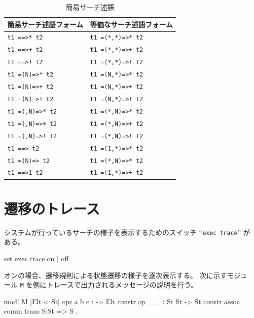 \documentclass{article}
\begin{document}
\begin{table}[htbp]
  \caption{簡易サーチ述語}
  \label{tab:easy-go}
  \begin{center}
    \begin{tabular} {|l|l|}\hline
      簡易サーチ述語フォーム & 等価なサーチ述語フォーム \\\hline\hline
      \texttt{t1 ==>* t2} & \texttt{t1 =(*,*)=>* t2} \\
      \texttt{t1 ==>+ t2} & \texttt{t1 =(*,*)=>+ t2} \\
      \texttt{t1 ==>! t2} & \texttt{t1 =(*,*)=>! t2} \\\hline
      \texttt{t1 =(N)=>* t2} & \texttt{t1 =(N,*)=>* t2} \\
      \texttt{t1 =(N)=>+ t2} & \texttt{t1 =(N,*)=>+ t2} \\
      \texttt{t1 =(N)=>! t2} & \texttt{t1 =(N,*)=>! t2} \\\hline
      \texttt{t1 =(,N)=>* t2} & \texttt{t1 =(*,N)=>* t2} \\
      \texttt{t1 =(,N)=>+ t2} & \texttt{t1 =(*,N)=>+ t2} \\
      \texttt{t1 =(,N)=>! t2} & \texttt{t1 =(*,N)=>! t2} \\\hline
      \texttt{t1 ==> t2} & \texttt{t1 =(1,*)=>* t2} \\
      \texttt{t1 =(N)=> t2} & \texttt{t1 =(*,N)=>* t2}\\
      \texttt{t1 ==>1 t2} & \texttt{t1 =(1,*)=>+ t2} \\\hline
    \end{tabular}
  \end{center}
\end{table}

\section{遷移のトレース}
\label{sec:trans-trace}
システムが行っているサーチの様子を表示するためのスイッチ
``\texttt{exec trace}'' がある。

\begin{simplev}
	set exec trace {on | off}
\end{simplev}

オンの場合、遷移規則による状態遷移の様子を逐次表示する。
次に示すモジュール \texttt{M} を例にトレースで出力されるメッセージの説明を行う。

\begin{simplev}
  mod! M {
  [Elt < St]
  ops a b c : -> Elt {constr}
  op _ _  : St St -> St {constr assoc comm}
  trans S:St => S . 
}
\end{simplev}
\end{document}
